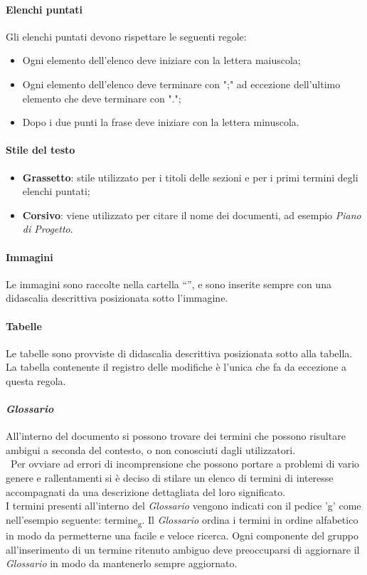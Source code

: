 \paragraph{Elenchi puntati}
Gli elenchi puntati devono rispettare le seguenti regole:
\begin{itemize} 
    \item Ogni elemento dell'elenco deve iniziare con la lettera maiuscola;
    \item Ogni elemento dell'elenco deve terminare con ";" ad eccezione dell'ultimo elemento
    che deve terminare con "."; 
    \item Dopo i due punti la frase deve iniziare con la lettera minuscola.
\end{itemize}

\paragraph{Stile del testo}
\begin{itemize} 
    \item \textbf{Grassetto}: stile utilizzato per i titoli delle sezioni e per i primi termini degli elenchi puntati;
    \item \textbf{Corsivo}: viene utilizzato per citare il nome dei documenti, ad esempio \textit{Piano di Progetto}. 
\end{itemize}

\paragraph{Immagini}
Le immagini sono raccolte nella cartella “”, e sono inserite sempre con una didascalia descrittiva posizionata sotto l’immagine.

\paragraph{Tabelle} 
Le tabelle sono provviste di didascalia descrittiva posizionata sotto alla tabella. La tabella contenente il registro delle modifiche è l’unica che fa da eccezione a questa regola.

\paragraph{\textit{Glossario}}
All'interno del documento si possono trovare dei termini che possono risultare ambigui a seconda del contesto, o non conosciuti dagli utilizzatori.\\\
Per ovviare ad errori di incomprensione che possono portare a problemi di vario genere e rallentamenti si è deciso di stilare un elenco di termini 
di interesse accompagnati da una descrizione dettagliata del loro significato.\\
I termini presenti all'interno del \textit{Glossario} vengono indicati con il pedice 'g' come nell'esempio seguente: termine\textsubscript{g}.
Il \textit{Glossario} ordina i termini in ordine alfabetico in modo da permetterne una facile e veloce ricerca.
Ogni componente del gruppo all'inserimento di un termine ritenuto ambiguo deve preoccuparsi di aggiornare il \textit{Glossario} in modo da mantenerlo sempre aggiornato.